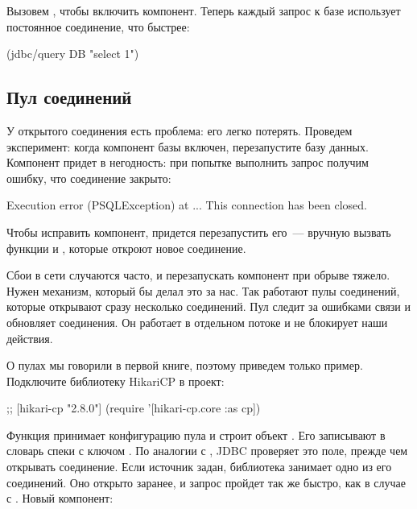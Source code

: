 Вызовем , чтобы включить компонент. Теперь каждый запрос к базе использует постоянное соединение, что быстрее:

\begin{english}
  \begin{clojure}
(jdbc/query DB "select 1")
  \end{clojure}
\end{english}

\subsection{Пул соединений}

У открытого соединения есть проблема: его легко потерять. Проведем эксперимент: когда компонент базы включен, перезапустите базу данных. Компонент придет в негодность: при попытке выполнить запрос получим ошибку, что соединение закрыто:

\begin{english}
  \begin{text}
Execution error (PSQLException) at ...
This connection has been closed.
  \end{text}
\end{english}

Чтобы исправить компонент, придется перезапустить его~--- вручную вызвать функции  и , которые откроют новое соединение.

Сбои в сети случаются часто, и перезапускать компонент при обрыве тяжело. Нужен механизм, который бы делал это за нас. Так работают пулы соединений, которые открывают сразу несколько соединений. Пул следит за ошибками связи и обновляет соединения. Он работает в отдельном потоке и не блокирует наши действия.

О пулах мы говорили в первой книге, поэтому приведем только пример. Подключите библиотеку HikariCP в проект:

\begin{english}
  \begin{clojure}
;; [hikari-cp "2.8.0"]
(require '[hikari-cp.core :as cp])
  \end{clojure}
\end{english}

Функция  принимает конфигурацию пула и строит объект . Его записывают в словарь спеки с ключом . По аналогии с , JDBC проверяет это поле, прежде чем открывать соединение. Если источник задан, библиотека занимает одно из его соединений. Оно открыто заранее, и запрос пройдет так же быстро, как в случае с . Новый компонент:

